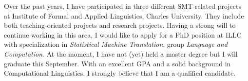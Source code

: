 \documentclass[a4paper, 12pt]{scrartcl}
\begin{document}
Over the past years, I have participated in three different SMT-related projects at Institute of Formal and Applied Linguistics, Charles University. They include both teaching-oriented projects and research projects. 
Having a strong will to continue working in this area, I would like to apply for a PhD position at ILLC with specialization in \emph{Statistical Machine Translation}, group \emph{Language and Computation}. 
At the moment, I have not (yet) held a master degree but I will graduate this September. With an excellent GPA and a solid background in Computational Linguistics, I strongly believe that I am a qualified candidate.
\end{document}
